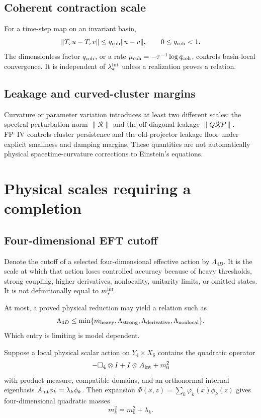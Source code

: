 \documentclass[11pt]{article}
\begin{document}
\subsection{Coherent contraction scale}

For a time-step map on an invariant basin,
\[
 \|T_\tau u-T_\tau v\|\le q_{\rm coh}\|u-v\|,
 \qquad0\le q_{\rm coh}<1.
\]
The dimensionless factor $q_{\rm coh}$, or a rate
$\mu_{\rm coh}=-\tau^{-1}\log q_{\rm coh}$, controls basin-local convergence.
It is independent of $\lambda_\ast^{\rm int}$ unless a realization proves a
relation.

\subsection{Leakage and curved-cluster margins}

Curvature or parameter variation introduces at least two different scales:
the spectral perturbation norm $\|\mathcal R\|$ and the off-diagonal leakage
$\|Q\mathcal RP\|$. FP~IV controls cluster persistence and the old-projector
leakage floor under explicit smallness and damping margins. These quantities
are not automatically physical spacetime-curvature corrections to Einstein's
equations.

\section{Physical scales requiring a completion}

\subsection{Four-dimensional EFT cutoff}

Denote the cutoff of a selected four-dimensional effective action by
$\Lambda_{4D}$. It is the scale at which that action loses controlled accuracy
because of heavy thresholds, strong coupling, higher derivatives, nonlocality,
unitarity limits, or omitted states. It is not definitionally equal to
$m_\ast^{\rm int}$.

At most, a proved physical reduction may yield a relation such as
\[
 \Lambda_{4D}\le
 \min\{m_{\rm heavy},\Lambda_{\rm strong},
             \Lambda_{\rm derivative},\Lambda_{\rm nonlocal}\}.
\]
Which entry is limiting is model dependent.

\begin{theorem}\label{thm:mass-bridge}
Suppose a local physical scalar action on $Y_4\times X_6$ contains the
quadratic operator
\[
 -\Box_4\otimes I+I\otimes A_{\rm int}+m_0^2
\]
with product measure, compatible domains, and an orthonormal internal
eigenbasis $A_{\rm int}\phi_k=\lambda_k\phi_k$. Then expansion
$\Phi(x,z)=\sum_k\varphi_k(x)\phi_k(z)$ gives four-dimensional quadratic
masses
\[
 m_k^2=m_0^2+\lambda_k.
\]
\end{theorem}
\end{document}

